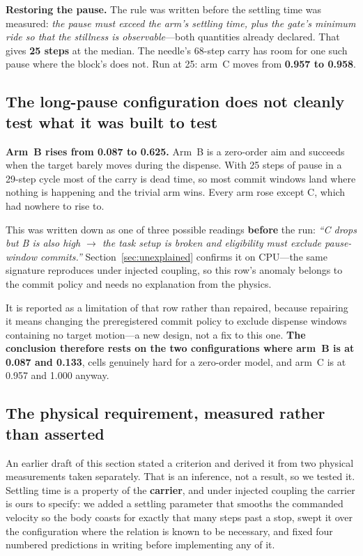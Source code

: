 \documentclass[10pt]{article}
\begin{document}
\textbf{Restoring the pause.} The rule was written before the settling time was
measured: \emph{the pause must exceed the arm's settling time, plus the gate's
minimum ride so that the stillness is observable}---both quantities already
declared. That gives \textbf{25 steps} at the median. The needle's 68-step carry
has room for one such pause where the block's does not. Run at 25: arm~C moves
from \textbf{0.957 to 0.958}.

\subsection{The long-pause configuration does not cleanly test what it was built to test}
\label{sec:longpause}

\textbf{Arm~B rises from 0.087 to 0.625.} Arm~B is a zero-order aim and succeeds
when the target barely moves during the dispense. With 25 steps of pause in a
29-step cycle most of the carry is dead time, so most commit windows land where
nothing is happening and the trivial arm wins. Every arm rose except C, which had
nowhere to rise to.

This was written down as one of three possible readings \textbf{before} the run:
\emph{``C drops but B is also high \(\rightarrow\) the task setup is broken and
eligibility must exclude pause-window commits.''} Section~\ref{sec:unexplained}
confirms it on CPU---the same signature reproduces under injected coupling, so
this row's anomaly belongs to the commit policy and needs no explanation from the
physics.

It is reported as a limitation of that row rather than repaired, because
repairing it means changing the preregistered commit policy to exclude dispense
windows containing no target motion---a new design, not a fix to this one.
\textbf{The conclusion therefore rests on the two configurations where arm~B is
at 0.087 and 0.133}, cells genuinely hard for a zero-order model, and arm~C is at
0.957 and 1.000 anyway.

\subsection{The physical requirement, measured rather than asserted}
\label{sec:sweep}

An earlier draft of this section stated a criterion and derived it from two
physical measurements taken separately. That is an inference, not a result, so we
tested it. Settling time is a property of the \textbf{carrier}, and under
injected coupling the carrier is ours to specify: we added a settling parameter
that smooths the commanded velocity so the body coasts for exactly that many
steps past a stop, swept it over the configuration where the relation is known to
be necessary, and fixed four numbered predictions in writing before implementing
any of it.
\end{document}
